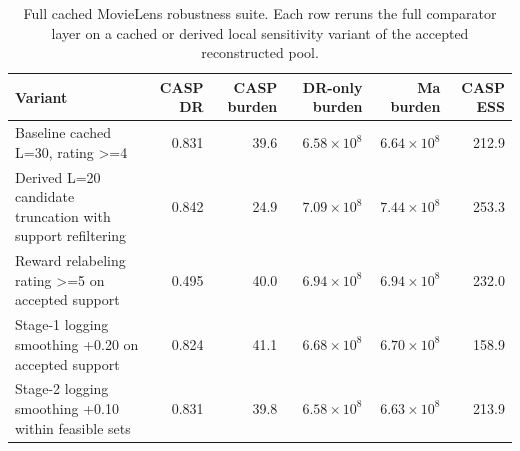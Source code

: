 \begin{table}[!htbp]
\centering
\small
\begin{tabularx}{\textwidth}{@{}Xrrrrr@{}}
\toprule
Variant & CASP DR & CASP burden & DR-only burden & Ma burden & CASP ESS \\
\midrule
Baseline cached L=30, rating >=4 & 0.831 & 39.6 & $6.58\times 10^8$ & $6.64\times 10^8$ & 212.9 \\
Derived L=20 candidate truncation with support refiltering & 0.842 & 24.9 & $7.09\times 10^8$ & $7.44\times 10^8$ & 253.3 \\
Reward relabeling rating >=5 on accepted support & 0.495 & 40.0 & $6.94\times 10^8$ & $6.94\times 10^8$ & 232.0 \\
Stage-1 logging smoothing +0.20 on accepted support & 0.824 & 41.1 & $6.68\times 10^8$ & $6.70\times 10^8$ & 158.9 \\
Stage-2 logging smoothing +0.10 within feasible sets & 0.831 & 39.8 & $6.58\times 10^8$ & $6.63\times 10^8$ & 213.9 \\
\bottomrule
\end{tabularx}
\caption{Full cached MovieLens robustness suite. Each row reruns the full comparator layer on a cached or derived local sensitivity variant of the accepted reconstructed pool.}
\label{tab:app-robustness-full}
\end{table}
